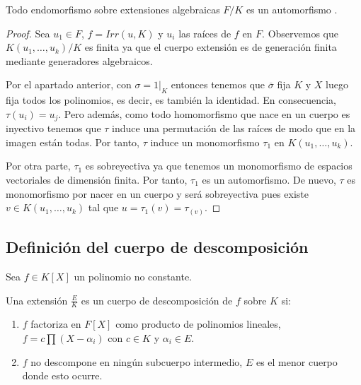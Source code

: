 \begin{corollary}
	Todo endomorfismo sobre extensiones algebraicas $F/K$ es un automorfismo . 
\end{corollary}
\begin{proof}
	Sea $u_1 \in F$, $f = Irr(u,K)$ y $u_i$ las raíces de $f$ en $F$. Observemos que $K(u_1,\ldots,u_k)/K$ es finita ya que el cuerpo extensión es de generación finita mediante generadores algebraicos. 
	
	Por el apartado anterior, con $\sigma = 1|_K$  entonces tenemos que $\overline{\sigma}$ fija $K$ y $X$ luego fija todos los polinomios, es decir, es también la identidad. En consecuencia, $\tau(u_i) = u_j$. Pero además, como todo homomorfismo que nace en un cuerpo es inyectivo tenemos que $\tau$ induce una permutación de las raíces de modo que en la imagen están todas. Por tanto, $\tau$ induce un monomorfismo $\tau_1$ en $K(u_1,\ldots,u_k)$.
	
	Por otra parte, $\tau_1$ es sobreyectiva ya que tenemos un monomorfismo de espacios vectoriales de dimensión finita. Por tanto, $\tau_1$ es un automorfismo. De nuevo, $\tau$ es monomorfismo por nacer en un cuerpo y será sobreyectiva pues existe $v \in K(u_1,\ldots,u_k)$ tal que $u = \tau_1(v) = \tau_(v)$. 
\end{proof}

\subsection{Definición del cuerpo de descomposición}

\begin{definition}
Sea $f \in K[X]$ un polinomio no constante. 

Una extensión $\frac{E}{K}$ es un cuerpo de descomposición de $f$ sobre $K$ si:

\begin{enumerate}
	\item $f$ factoriza en $F[X]$ como producto de polinomios lineales, $f = c \prod (X - \alpha_i)$ con $c \in K$ y $\alpha_i \in E$.
	\item $f$ no descompone en ningún subcuerpo intermedio, $E$ es el menor cuerpo donde esto ocurre. 
\end{enumerate}  
\end{definition}

